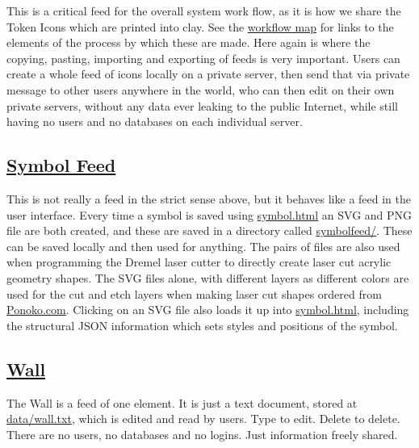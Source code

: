 This is a critical feed for the overall system work flow, as it is how
we share the Token Icons which are printed into clay. See the
\href{maps/workflow}{workflow map} for links to the elements of the
process by which these are made. Here again is where the copying,
pasting, importing and exporting of feeds is very important. Users can
create a whole feed of icons locally on a private server, then send that
via private message to other users anywhere in the world, who can then
edit on their own private servers, without any data ever leaking to the
public Internet, while still having no users and no databases on each
individual server.

\subsection{\texorpdfstring{\href{symbolfeed.html}{Symbol
Feed}}{Symbol Feed}}\label{symbol-feed}

This is not really a feed in the strict sense above, but it behaves like
a feed in the user interface. Every time a symbol is saved using
\url{symbol.html} an SVG and PNG file are both created, and these are
saved in a directory called \url{symbolfeed/}. These can be saved
locally and then used for anything. The pairs of files are also used
when programming the Dremel laser cutter to directly create laser cut
acrylic geometry shapes. The SVG files alone, with different layers as
different colors are used for the cut and etch layers when making laser
cut shapes ordered from \href{https://www.ponoko.com/}{Ponoko.com}.
Clicking on an SVG file also loads it up into \url{symbol.html},
including the structural JSON information which sets styles and
positions of the symbol.

\subsection{\texorpdfstring{\href{wall.html}{Wall}}{Wall}}\label{wall}

The Wall is a feed of one element. It is just a text document, stored at
\url{data/wall.txt}, which is edited and read by users. Type to edit.
Delete to delete. There are no users, no databases and no logins. Just
information freely shared.
